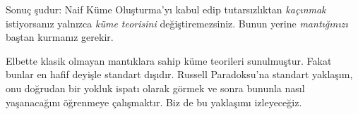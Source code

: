 Sonuç şudur: Naif Küme Oluşturma'yı kabul edip tutarsızlıktan
\emph{kaçınmak} istiyorsanız yalnızca \emph{küme teorisini} değiştiremezsiniz.
Bunun yerine \emph{mantığınızı} baştan kurmanız gerekir.

Elbette klasik olmayan mantıklara sahip küme teorileri sunulmuştur. Fakat
bunlar en hafif deyişle standart dışıdır. Russell Paradoksu'na standart
yaklaşım, onu doğrudan bir yokluk ispatı olarak görmek ve sonra bununla nasıl
yaşanacağını öğrenmeye çalışmaktır. Biz de bu yaklaşımı izleyeceğiz.

